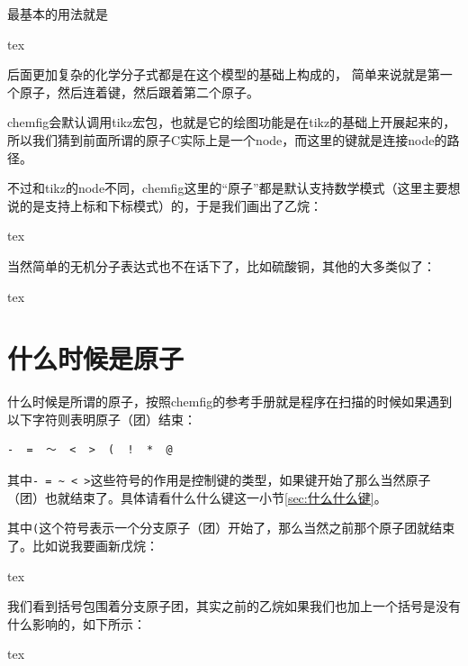 \documentclass[12pt,oneside]{book}
\begin{document}
\begin{common-format}
最基本的用法就是
\begin{tcbcode}{tex}
\end{tcbcode}


后面更加复杂的化学分子式都是在这个模型的基础上构成的， 简单来说就是第一个原子，然后连着键，然后跟着第二个原子。

chemfig会默认调用tikz宏包，也就是它的绘图功能是在tikz的基础上开展起来的，所以我们猜到前面所谓的原子C实际上是一个node，而这里的键就是连接node的路径。

不过和tikz的node不同，chemfig这里的“原子”都是默认支持数学模式（这里主要想说的是支持上标和下标模式）的，于是我们画出了乙烷：
\begin{tcbcode}{tex}
\end{tcbcode}


当然简单的无机分子表达式也不在话下了，比如硫酸铜，其他的大多类似了：
\begin{tcbcode}{tex}
\end{tcbcode}


\section{什么时候是原子}
什么时候是所谓的原子，按照chemfig的参考手册就是程序在扫描的时候如果遇到以下字符则表明原子（团）结束：
\begin{Verbatim}
-  =  ～  <  >  (  !  *  @
\end{Verbatim}

其中\verb+- = ~ < >+这些符号的作用是控制键的类型，如果键开始了那么当然原子（团）也就结束了。具体请看什么什么键这一小节\ref{sec:什么什么键}。

其中\verb+(+这个符号表示一个分支原子（团）开始了，那么当然之前那个原子团就结束了。比如说我要画新戊烷：
\begin{tcbcode}{tex}
\end{tcbcode}


我们看到括号包围着分支原子团，其实之前的乙烷如果我们也加上一个括号是没有什么影响的，如下所示：
\begin{tcbcode}{tex}
\end{tcbcode}



\end{common-format}
\end{document}

